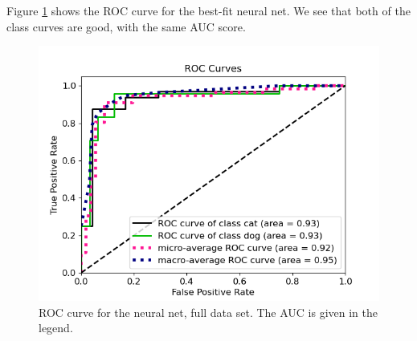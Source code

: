 \documentclass[a4paper]{article}
\begin{document}
Figure \ref{fig:nn_roc_nonpca} shows the ROC curve for the best-fit neural net. We see that both of the class curves are good, with the same AUC score.
\begin{figure}[H]
	\centering
	\includegraphics[scale=0.6]{../figures/neural_net/roc_nbins200_pca0_seed4155_ts0.20.png}
	\caption{ROC curve for the neural net, full data set. The AUC is given in the legend.}
	\label{fig:nn_roc_nonpca}
\end{figure}	
\end{document}
